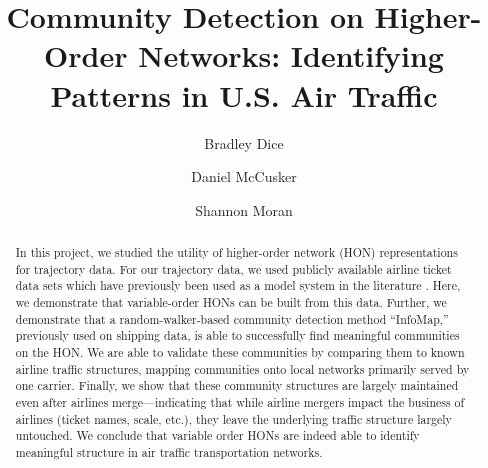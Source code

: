 \documentclass[sigconf]{acmart}
\begin{document}
\title{Community Detection on Higher-Order Networks: Identifying Patterns in U.S. Air Traffic}

\author{Bradley Dice}

\author{Daniel McCusker}

\author{Shannon Moran}

\renewcommand{\shortauthors}{Dice, et al.}

\begin{abstract}
In this project, we studied the utility of higher-order network (HON) representations for trajectory data. For our trajectory data, we used publicly available airline ticket data sets which have previously been used as a model system in the literature \cite{Rosvall2014}. Here, we demonstrate that variable-order HONs can be built from this data. Further, we demonstrate that a random-walker-based community detection method ``InfoMap,'' previously used on shipping data, is able to successfully find meaningful communities on the HON. We are able to validate these communities by comparing them to known airline traffic structures, mapping communities onto local networks primarily served by one carrier. Finally, we show that these community structures are largely maintained even after airlines merge---indicating that while airline mergers impact the business of airlines (ticket names, scale, etc.), they leave the underlying traffic structure largely untouched. We conclude that variable order HONs are indeed able to identify meaningful structure in air traffic transportation networks.
\end{abstract}

\maketitle
\end{document}
